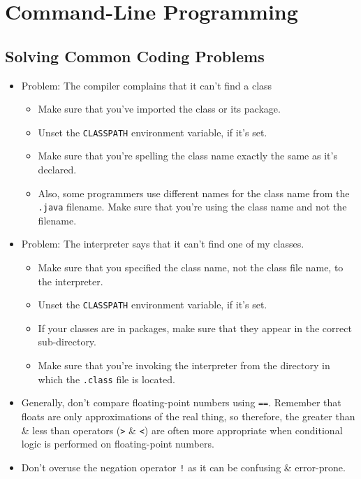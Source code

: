 \documentclass[a4paper,11pt]{article}
\begin{document}
\section{Command-Line Programming}
\subsection{Solving Common Coding Problems}
\begin{itemize}
    \item   Problem: The compiler complains that it can't find a class
            \begin{itemize}
                \item   Make sure that you've imported the class or its package. 
                \item   Unset the \verb|CLASSPATH| environment variable, if it's set.
                \item   Make sure that you're spelling the class name exactly the same as it's declared. 
                \item   Also, some programmers use different names for the class name from the \verb|.java| filename. 
                        Make sure that you're using the class name and not the filename.
                \end{itemize}

    \item   Problem: The interpreter says that it can't find one of my classes.
            \begin{itemize}
                \item   Make sure that you specified the class name, not the class file name, to the interpreter.
                \item   Unset the \verb|CLASSPATH| environment variable, if it's set.
                \item   If your classes are in packages, make sure that they appear in the correct sub-directory.
                \item   Make sure that you're invoking the interpreter from the directory in which the \verb|.class| file is 
                        located.
            \end{itemize}

    \item   Generally, don't compare floating-point numbers using \verb|==|.
            Remember that floats are only approximations of the real thing, so therefore, the greater than \& less than 
            operators (\verb|>| \& \verb|<|) are often more appropriate when conditional logic is performed on floating-point 
            numbers.
    \item   Don't overuse the negation operator \verb|!| as it can be confusing \& error-prone.
\end{itemize}
\end{document}

